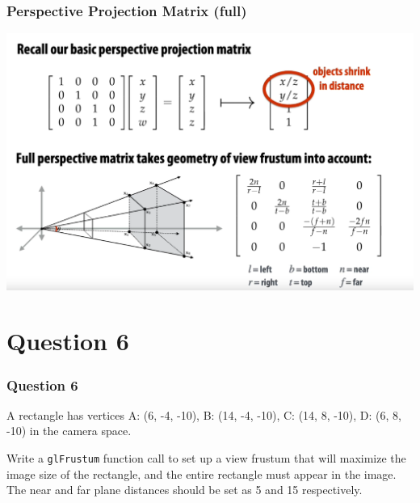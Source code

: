\documentclass{beamer}
\begin{document}
\begin{frame}
    \frametitle{Perspective Projection Matrix (full)}

    \begin{center}
        \includegraphics[scale=0.4]{images/perspective-proj-full.png}
    \end{center}

\end{frame}

\section{Question 6}

\begin{frame}
    \frametitle{Question 6}
    A rectangle has vertices A: (6, -4, -10), B: (14, -4, -10), 
    C: (14, 8, -10), D: (6, 8, -10) in the camera space. 

    \vspace{1em}

    Write a \texttt{glFrustum} function call to set up a view frustum that 
    will maximize the image size of the rectangle, and the entire 
    rectangle must appear in the image. The near and far plane 
    distances should be set as 5 and 15 respectively. 
\end{frame}
\end{document}
